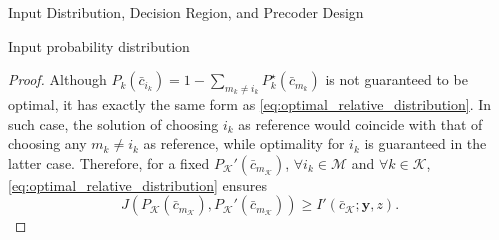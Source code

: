 \documentclass[journal]{IEEEtran}
\begin{document}
\begin{section}{Input Distribution, Decision Region, and Precoder Design}
\begin{subsection}{Input probability distribution}
\begin{proof}
				Although $P_k(\bar{c}_{i_k}) = 1 - \sum_{m_k \ne i_k} P_k^{\star}(\bar{c}_{m_k})$ is not guaranteed to be optimal, it has exactly the same form as \eqref{eq:optimal_relative_distribution}. In such case, the solution of choosing $i_k$ as reference would coincide with that of choosing any $m_k \ne i_k$ as reference, while optimality for $i_k$ is guaranteed in the latter case. Therefore, for a fixed $P_{\mathcal{K}}'(\bar{c}_{m_{\mathcal{K}}})$, $\forall i_k \in \mathcal{M}$ and $\forall k \in \mathcal{K}$, \eqref{eq:optimal_relative_distribution} ensures
				\begin{equation}
					J \left( P_{\mathcal{K}}(\bar{c}_{m_{\mathcal{K}}}),P_{\mathcal{K}}'(\bar{c}_{m_{\mathcal{K}}}) \right) \ge I'(\bar{c}_{\mathcal{K}};\boldsymbol{y},z).
					\label{eq:information_difference_lower}
				\end{equation}


\end{proof}
\end{subsection}
\end{section}
\end{document}
